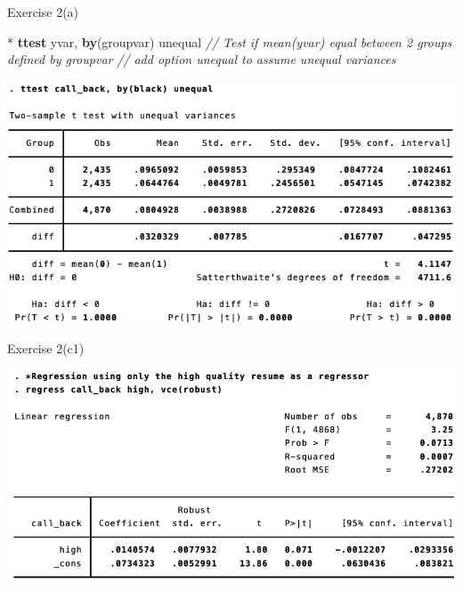 \documentclass[
  10pt,
  ignorenonframetext,
]{beamer}
\newenvironment{Shaded}{\begin{snugshade}}{\end{snugshade}}
\newcommand{\CommentTok}[1]{\textcolor[rgb]{0.56,0.35,0.01}{\textit{#1}}}
\newcommand{\KeywordTok}[1]{\textcolor[rgb]{0.13,0.29,0.53}{\textbf{#1}}}
\newcommand{\NormalTok}[1]{#1}
\begin{document}
\begin{frame}[fragile]{Exercise 2(a)}
\protect\hypertarget{exercise-2a}{}
\small

\begin{Shaded}
\begin{Highlighting}[]
\NormalTok{* }\KeywordTok{ttest}\NormalTok{ yvar, }\KeywordTok{by}\NormalTok{(groupvar) unequal}
\CommentTok{// Test if mean(yvar) equal between 2 groups defined by groupvar}
\CommentTok{// add option \textquotesingle{}unequal\textquotesingle{} to assume unequal variances}
\end{Highlighting}
\end{Shaded}

\begin{center}\includegraphics[width=0.9\linewidth]{pictures/res2-ttestBlack} \end{center}
\end{frame}

\begin{frame}{Exercise 2(c1)}
\protect\hypertarget{res3-regHigh}{}
\begin{center}\includegraphics[width=1\linewidth]{pictures/res3-regHigh} \end{center}
\end{frame}
\end{document}
